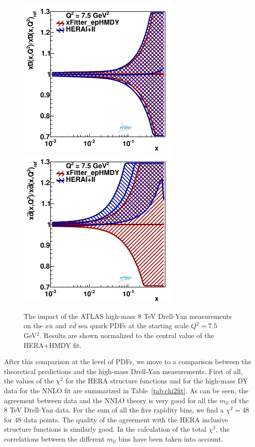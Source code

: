 \begin{figure}[t]
\centering
\includegraphics[width=8cm]{figs/q2_7_5_pdf_ubar_ratio.pdf}
\includegraphics[width=8cm]{figs/q2_7_5_pdf_dbar_ratio.pdf} 
\caption{The impact of the ATLAS high-mass 8 TeV Drell-Yan measurements
  on the $x\bar{u}$ and $x\bar{d}$ sea quark PDFs at the starting scale $Q^2=7.5$ GeV$^2$.
  Results are shown normalized to the central value of the HERA+HMDY fit.
}
\label{fig:QCDfit}
\end{figure}

After this comparison at the level of PDFs, we move to a comparison between the theoretical
predictions and the high-mass Drell-Yan measurements.
%
First of all, the values of the $\chi^2$ for the HERA structure functions
and for the high-mass DY data for the NNLO fit
are summarized in Table~\ref{tab:chi2fit}.
%
As can be seen, the agreement between data and the NNLO theory
is very good for all the $m_{ll}$ of the $8$ TeV Drell-Yan data.
%
For the sum of all the five rapidity bins, we find a $\chi^2=48$
for $48$ data points.
%
The quality of the agreement with the HERA inclusive structure functions
is similarly good.
%
In the calculation of the total $\chi^2$, the correlations between the different
$m_{ll}$ bins have been taken into account.

